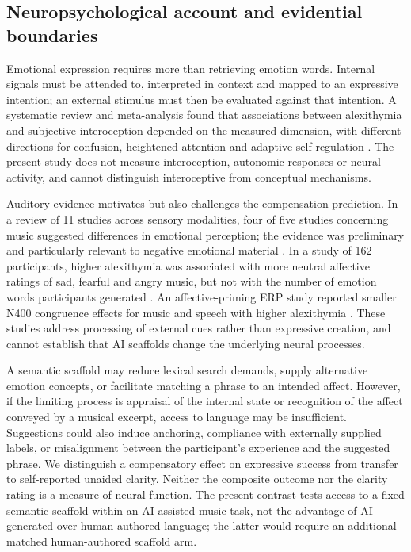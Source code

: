 \documentclass[11pt,a4paper]{article}
\begin{document}
\subsection{Neuropsychological account and evidential boundaries}
Emotional expression requires more than retrieving emotion words. Internal signals must be attended to, interpreted in context and mapped to an expressive intention; an external stimulus must then be evaluated against that intention. A systematic review and meta-analysis found that associations between alexithymia and subjective interoception depended on the measured dimension, with different directions for confusion, heightened attention and adaptive self-regulation \parencite{vanbael2024}. The present study does not measure interoception, autonomic responses or neural activity, and cannot distinguish interoceptive from conceptual mechanisms.

Auditory evidence motivates but also challenges the compensation prediction. In a review of 11 studies across sensory modalities, four of five studies concerning music suggested differences in emotional perception; the evidence was preliminary and particularly relevant to negative emotional material \parencite{suslow2021}. In a study of 162 participants, higher alexithymia was associated with more neutral affective ratings of sad, fearful and angry music, but not with the number of emotion words participants generated \parencite{larwood2021}. An affective-priming ERP study reported smaller N400 congruence effects for music and speech with higher alexithymia \parencite{goerlich2011}. These studies address processing of external cues rather than expressive creation, and cannot establish that AI scaffolds change the underlying neural processes.

A semantic scaffold may reduce lexical search demands, supply alternative emotion concepts, or facilitate matching a phrase to an intended affect. However, if the limiting process is appraisal of the internal state or recognition of the affect conveyed by a musical excerpt, access to language may be insufficient. Suggestions could also induce anchoring, compliance with externally supplied labels, or misalignment between the participant's experience and the suggested phrase. We distinguish a compensatory effect on expressive success from transfer to self-reported unaided clarity. Neither the composite outcome nor the clarity rating is a measure of neural function. The present contrast tests access to a fixed semantic scaffold within an AI-assisted music task, not the advantage of AI-generated over human-authored language; the latter would require an additional matched human-authored scaffold arm.
\end{document}
